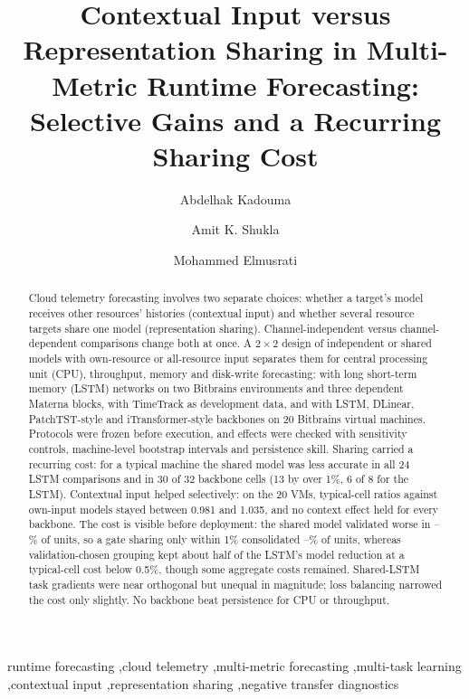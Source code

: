 \documentclass[5p,twocolumn]{elsarticle}
\begin{document}
\begin{frontmatter}

\title{Contextual Input versus Representation Sharing in Multi-Metric Runtime Forecasting: Selective Gains and a Recurring Sharing Cost}

\author[uva]{Abdelhak Kadouma}
\author[uva,sau]{Amit K. Shukla}
\author[uva]{Mohammed Elmusrati}



\begin{abstract}
Cloud telemetry forecasting involves two separate choices:
whether a target's model receives other resources' histories (contextual
input) and whether several resource targets share one model (representation
sharing). Channel-independent versus channel-dependent comparisons change
both at once. A $2\times2$ design of independent or shared models with
own-resource or all-resource input separates them for central processing unit
(CPU), throughput, memory and disk-write forecasting: with long short-term
memory (LSTM) networks on two Bitbrains environments and three dependent
Materna blocks, with TimeTrack as development data, and with LSTM, DLinear,
PatchTST-style and iTransformer-style backbones on 20 Bitbrains virtual
machines. Protocols were frozen before execution, and effects were checked
with sensitivity controls, machine-level bootstrap intervals and persistence
skill. Sharing carried a recurring cost: for a typical machine the shared
model was less accurate in all 24 LSTM comparisons and in 30 of 32 backbone
cells (13 by over 1\%, 6 of 8 for the LSTM). Contextual input helped
selectively: on the 20 VMs, typical-cell ratios against own-input models
stayed between 0.981 and 1.035, and no context effect held for every backbone. The cost is
visible before deployment: the shared model validated worse in
\AiiiValWorseMin--\AiiiValWorseMax\% of units, so a
gate sharing only within 1\% consolidated \AiiiRetainedOne--\AiiiRetainedTwo\%
of units, whereas validation-chosen grouping kept about half of the LSTM's
model reduction at a typical-cell cost below 0.5\%, though some aggregate costs
remained.
Shared-LSTM task gradients were near orthogonal but unequal in magnitude;
loss balancing narrowed the cost only slightly. No backbone beat persistence
for CPU or throughput.
\end{abstract}

\begin{keyword}
runtime forecasting \sep cloud telemetry \sep multi-metric forecasting \sep multi-task learning \sep contextual input \sep representation sharing \sep negative transfer diagnostics
\end{keyword}

\end{frontmatter}
\end{document}
